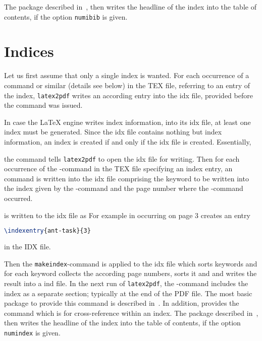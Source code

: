 The package  described in~\cite{TocBibIndP}, 
then writes the headline of the index into the table of contents, 
if the option \texttt{numibib} is given.


\section{Indices}\label{sec:indices}

Let us first assume that only a single index is wanted. 
For each occurrence 
of a command  or similar (details see below) in the TEX file, 
referring to an entry of the index,
\texttt{latex2pdf} writes an according entry  
into the \gls{idx} file, provided before the command  was issued. 

In case the \LaTeX{} engine writes index information, 
into its \gls{idx} file, at least one index must be generated. 
Since the \gls{idx} file contains nothing but index information, 
an index is created if and only if the \gls{idx} file is created. 
Essentially, 

the command  tells \texttt{latex2pdf} 
to open the \gls{idx} file for writing. 
Then for each occurrence of the -command in the TEX file 
specifying an index entry, 
an  command is written into the \gls{idx} file 
comprising the keyword to be written into the index given by the -command 
and the page number where the -command occurred. 

 is written to the \gls{idx} file as 
For example  in occurring on page 3 creates an entry 
%
\begin{lstlisting}[language=TeX]
\indexentry{ant-task}{3}
\end{lstlisting}
%
in the IDX file. 

Then the \texttt{makeindex}-command is applied to the \gls{idx} file 
which sorts keywords and for each keyword collects the according page numbers, 
sorts it and and writes the result into a \gls{ind} file. 
In the next run of \texttt{latex2pdf}, 
the -command includes the index as a separate section; 
typically at the end of the PDF file. 
The most basic package to provide this command 
is  described in~\cite{MkidxShIdxP}. 
In addition,  provides the command  
which is for cross-reference within an index. 
The package  described in~\cite{TocBibIndP}, 
then writes the headline of the index into the table of contents, 
if the option \texttt{numindex} is given.

